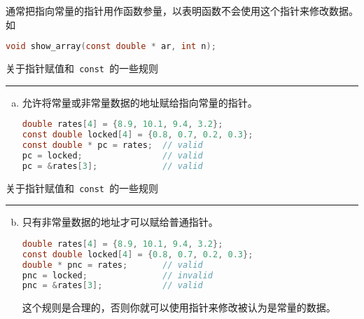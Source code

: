 \begin{frame}[fragile]
通常把指向常量的指针用作函数参量，以表明函数不会使用这个指针来修改数据。如
\begin{lstlisting}[language=c,backgroundcolor=\color{red!20}]
void show_array(const double * ar, int n);
\end{lstlisting} 
\end{frame}

\begin{frame}[fragile]
关于指针赋值和\lstinline| const |的一些规则
\rule{\textwidth}{0.2mm} 
\begin{enumerate}[(a)]\setcounter{enumi}{0}
\item 允许将常量或非常量数据的地址赋给指向常量的指针。
\begin{lstlisting}[language=c,backgroundcolor=\color{red!20}]
double rates[4] = {8.9, 10.1, 9.4, 3.2};
const double locked[4] = {0.8, 0.7, 0.2, 0.3};
const double * pc = rates;  // valid
pc = locked;                // valid
pc = &rates[3];             // valid
\end{lstlisting} 
\end{enumerate}
\end{frame}

\begin{frame}[fragile]
关于指针赋值和\lstinline| const |的一些规则
\rule{\textwidth}{0.2mm} 

\begin{enumerate}[(a)]\setcounter{enumi}{1}
\item 只有非常量数据的地址才可以赋给普通指针。
\begin{lstlisting}[language=c,backgroundcolor=\color{red!20}]
double rates[4] = {8.9, 10.1, 9.4, 3.2};
const double locked[4] = {0.8, 0.7, 0.2, 0.3};
double * pnc = rates;       // valid
pnc = locked;               // invalid
pnc = &rates[3];            // valid
\end{lstlisting} 
这个规则是合理的，否则你就可以使用指针来修改被认为是常量的数据。
\end{enumerate}
\end{frame}

